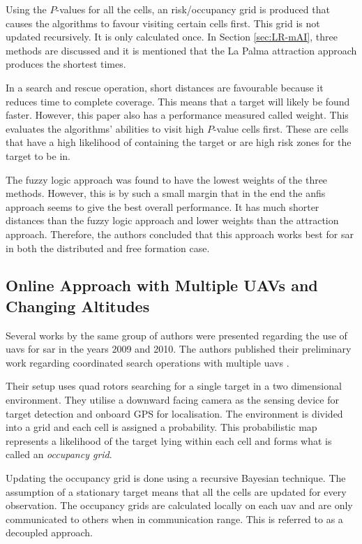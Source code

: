 Using the $P$-values for all the cells, an risk/occupancy grid is produced that causes the algorithms to favour visiting certain cells first. This grid is not updated recursively. It is only calculated once. In Section \ref{sec:LR-mAI}, three methods are discussed and it is mentioned that the La Palma attraction approach produces the shortest times.

In a search and rescue operation, short distances are favourable because it reduces time to complete coverage. This means that a target will likely be found faster. However, this paper also has a performance measured called weight. This evaluates the algorithms' abilities to visit high $P$-value cells first. These are cells that have a high likelihood of containing the target or are high risk zones for the target to be in.

The fuzzy logic approach was found to have the lowest weights of the three methods. However, this is by such a small margin that in the end the \ac{anfis} approach seems to give the best overall performance. It has much shorter distances than the fuzzy logic approach and lower weights than the attraction approach. Therefore, the authors concluded that this approach works best for \ac{sar} in both the distributed and free formation case. 
\subsection{Online Approach with Multiple UAVs and Changing Altitudes}
\label{sec:LR SAR Decision Theory}
Several works by the same group of authors were presented regarding the use of \acp{uav} for \acl{sar} in the years 2009 and 2010. The authors published their preliminary work regarding coordinated search operations with multiple \acp{uav} \cite{Waharte2009}. 

Their setup uses quad rotors searching for a single target in a two dimensional environment. They utilise a downward facing camera as the sensing device for target detection and onboard GPS for localisation. The environment is divided into a grid and each cell is assigned a probability. This probabilistic map represents a likelihood of the target lying within each cell and forms what is called an \emph{occupancy grid}.

Updating the occupancy grid is done using a recursive Bayesian technique. The assumption of a stationary target means that all the cells are updated for every observation. The occupancy grids are calculated locally on each \ac{uav} and are only communicated to others when in communication range. This is referred to as a decoupled approach. 

